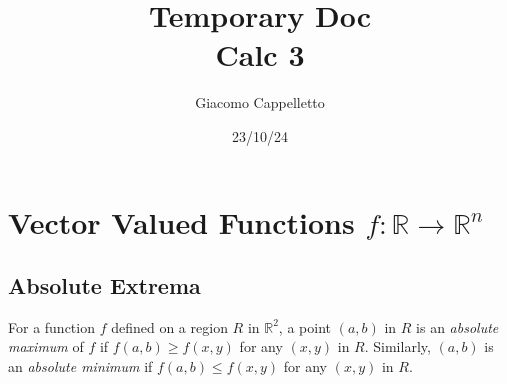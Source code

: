 \documentclass{report}
\title{\Huge{Temporary Doc}\\Calc 3}
\author{\huge{Giacomo Cappelletto}}
\date{23/10/24}
\begin{document}
\maketitle
\newpage
{}
\tableofcontents
\pagebreak

\chapter{Vector Valued Functions $f:\mathbb{R} \rightarrow \mathbb{R}^n$}


\section{Absolute Extrema}

For a function \( f \) defined on a region \( R \) in \( \mathbb{R}^2 \), a point \( (a, b) \) in \( R \) is an \emph{absolute maximum} of \( f \) if \( f(a, b) \geq f(x, y) \) for any \( (x, y) \) in \( R \). Similarly, \( (a, b) \) is an \emph{absolute minimum} if \( f(a, b) \leq f(x, y) \) for any \( (x, y) \) in \( R \).

\end{document}
